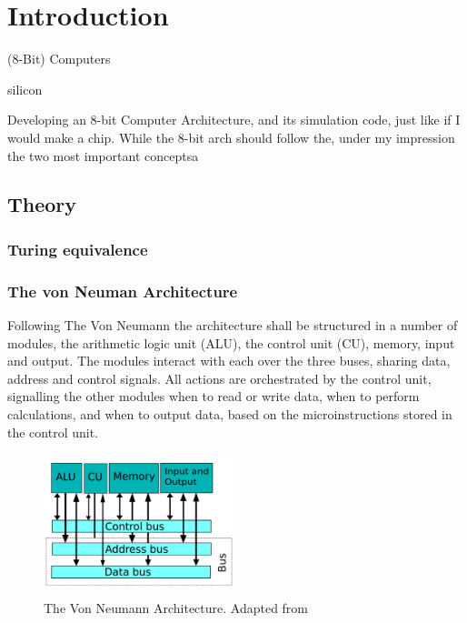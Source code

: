 \chapter{Introduction}
(8-Bit) Computers

silicon


Developing an 8-bit Computer Architecture, and its simulation code, just like if I would make a chip. 
While the 8-bit arch should follow the, under my impression the two most important conceptsa
\section{Theory}
\subsection{Turing equivalence}
\cite{turing1936a}

\subsection{The von Neuman Architecture}
\cite{vonneuman1945a}

Following The Von Neumann the architecture shall be structured in a number of modules, the arithmetic logic unit (ALU), the control unit (CU), memory, input and output. The modules interact with each over the three buses, sharing data, address and control signals. All actions are orchestrated by the control unit, signalling the other modules when to read or write data, when to perform calculations, and when to output data, based on the microinstructions stored in the control unit.

\begin{figure}[H]
  \begin{center}
    \includegraphics[width=0.5\textwidth]{figures/VNA}
  \end{center}
  \caption{The Von Neumann Architecture. Adapted from \cite{fig-vna}}\label{fig:vna}
\end{figure}

